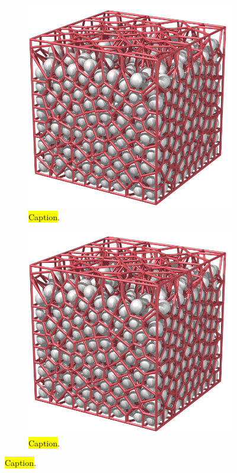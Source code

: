 %
\begin{figure}[htpb]%
\centering%
    \begin{subfigure}[b]{0.35\textwidth}%
    \includegraphics[width=\textwidth]{images/voronoi/import_AM2_A001.png}%
    \caption{%
        \hl{Caption}. %
    }%
    \end{subfigure}%
    \hspace{1em}%
    \begin{subfigure}[b]{0.35\textwidth}%
    \includegraphics[width=\textwidth]{images/voronoi/import_AM2_A001.png}%
    \caption{%
        \hl{Caption}. %
    }%
    \end{subfigure}
\end{figure}%

